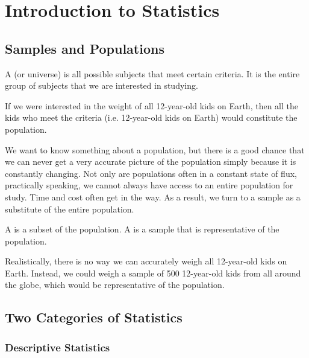 \chapter{Introduction to Statistics}

\section{Samples and Populations}

\begin{definition}
    A  (or universe) is all possible subjects that meet certain criteria. It is the entire group of subjects that we are interested in studying.
\end{definition}

\begin{example}[Population]
    If we were interested in the weight of all 12-year-old kids on Earth, then all the kids who meet the criteria (i.e. 12-year-old kids on Earth) would constitute the population.
\end{example}

We want to know something about a population, but there is a good chance that we can never get a very accurate picture of the population simply because it is constantly changing. Not only are populations often in a constant state of flux, practically speaking, we cannot always have access to an entire population for study. Time and cost often get in the way. As a result, we turn to a sample as a substitute of the entire population.

\begin{definition}
    A  is a subset of the population. A  is a sample that is representative of the population.
\end{definition}

\begin{example}[Sample]
    Realistically, there is no way we can accurately weigh all 12-year-old kids on Earth. Instead, we could weigh a sample of 500 12-year-old kids from all around the globe, which would be representative of the population.
\end{example}

\section{Two Categories of Statistics}

\subsection{Descriptive Statistics}

